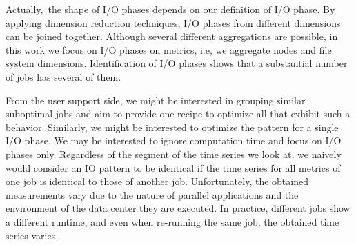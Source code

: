 \documentclass[]{llncs}
\begin{document}
Actually,\ the shape of I/O phases depends on our definition of I/O phase.
By applying dimension reduction techniques, I/O phases from different dimensions can be joined together.
Although several different aggregations are possible, in this work we focus on  I/O phases on metrics, i.e, we aggregate nodes and file system dimensions.
Identification of I/O phases shows that a substantial number of jobs has several of them.

From the user support side, we might be interested in grouping similar suboptimal jobs and aim to provide one recipe to optimize all that exhibit such a behavior.
Similarly, we might be interested to optimize the pattern for a single I/O phase.
We may be interested to ignore computation time and focus on I/O phases only.
Regardless of the segment of the time series we look at, we naively would consider an IO pattern to be identical if the time series for all metrics of one job is identical to those of another job.
Unfortunately, the obtained measurements vary due to the nature of parallel applications and the environment of the data center they are executed.
In practice, different jobs show a different runtime, and even when re-running the same job, the obtained time series varies.
\end{document}
